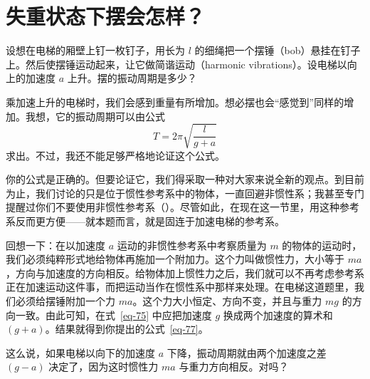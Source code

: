 
\chapter[失重状态下摆会怎样？]{失重状态下摆会怎样？\label{ch-12}}

\begin{dialogue}

\tchr 设想在电梯的厢壁上钉一枚钉子，用长为 $l$ 的细绳把一个摆锤（bob）悬挂在钉子上。然后使摆锤运动起来，让它做简谐运动（harmonic vibrations）。设电梯以向上的加速度 $a$ 上升。摆的振动周期是多少？

\stda 乘加速上升的电梯时，我们会感到重量有所增加。想必摆也会“感觉到”同样的增加。我想，它的振动周期可以由公式
\begin{equation}%
T = 2 \pi \sqrt{\frac{l}{g+a}}
\label{eq-77}
\end{equation}
求出。不过，我还不能足够严格地论证这个公式。

\tchr 你的公式是正确的。但要论证它，我们得采取一种对大家来说全新的观点。到目前为止，我们讨论的只是位于惯性参考系中的物体，一直回避非惯性系；我甚至专门提醒过你们不要使用非惯性参考系（）。尽管如此，在现在这一节里，用这种参考系反而更方便——就本题而言，就是固连于加速电梯的参考系。

回想一下：在以加速度 $a$ 运动的非惯性参考系中考察质量为 $m$ 的物体的运动时，我们必须纯粹形式地给物体再施加一个附加力。这个力叫做惯性力，大小等于 $ma$，方向与加速度的方向相反。给物体加上惯性力之后，我们就可以不再考虑参考系正在加速运动这件事，而把运动当作在惯性系中那样来处理。在电梯这道题里，我们必须给摆锤附加一个力 $ma$。这个力大小恒定、方向不变，并且与重力 $mg$ 的方向一致。由此可知，在式~\eqref{eq-75} 中应把加速度 $g$ 换成两个加速度的算术和 $(g+a)$。结果就得到你提出的公式~\eqref{eq-77}。

\stda 这么说，如果电梯以向下的加速度 $a$ 下降，振动周期就由两个加速度之差 $(g-a)$ 决定了，因为这时惯性力 $ma$ 与重力方向相反。对吗？


\end{dialogue}
